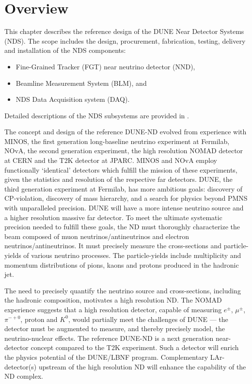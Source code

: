 \section{Overview} %
\label{sec:detectors-nd-ref-ov}

This chapter describes the reference design of the DUNE Near Detector
Systems (NDS). The scope includes the design, procurement,
fabrication, testing, delivery and installation of the NDS components:
\begin{itemize}
\item Fine-Grained Tracker (FGT) near neutrino detector (NND),
\item Beamline Measurement System (BLM), and
\item NDS Data Acquisition system (DAQ).
\end{itemize}
Detailed descriptions of the NDS subsystems are provided in \anxndref. 


The concept and design of the reference DUNE-ND evolved from
experience with MINOS, the first generation long-baseline
neutrino experiment at Fermilab, NOvA, the second generation
experiment, the high resolution NOMAD detector at CERN and the T2K
detector at JPARC. MINOS and NOvA employ functionally `identical'
detectors which fulfill the mission of these experiments, given the
statistics and resolution of the respective far detectors.  DUNE, the
third generation experiment at Fermilab, has more ambitious goals:
discovery of CP-violation, discovery of mass hierarchy, and a search
for physics beyond PMNS with unparalleled precision. DUNE will have a
more intense neutrino source and a higher resolution massive far detector.  To
meet the ultimate systematic precision needed to fulfill these goals,
the ND must thoroughly characterize the beam composed of muon
neutrinos/antineutrinos and electron neutrinos/antineutrinos. It must
precisely measure the cross-sections and particle-yields of various
neutrino processes.  The particle-yields include multiplicity and
momentum distributions of pions, kaons and protons produced in the
hadronic jet.

The need to precisely quantify the neutrino source and
cross-sections, including the hadronic composition, motivates
a high resolution ND. The NOMAD experience suggests that a high
resolution detector, capable of measuring $e^{\pm}$, $\mu^{\pm}$,
$\pi^{-+0}$, proton and $K^{0}$, would partially meet the
challenges of DUNE --- the detector must be augmented to measure, and
thereby precisely model, the neutrino-nuclear effects. The reference
DUNE-ND is a next generation near-detector concept
compared to the T2K experiment. Such a detector will
enrich the physics potential of the DUNE/LBNF program.  Complementary
LAr-detector(s) upstream of the high resolution ND will enhance the
capability of the ND complex.


